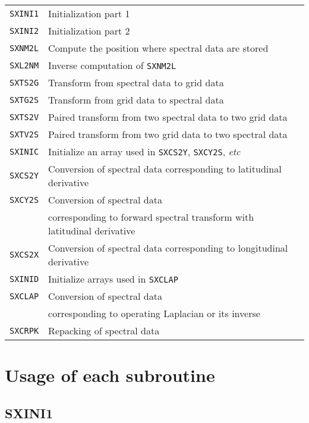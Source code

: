 \documentclass[a4paper]{scrartcl}
\begin{document}
\vspace{1em}
\begin{tabular}{ll}
\texttt{SXINI1} & Initialization part 1\\
\texttt{SXINI2} & Initialization part 2\\  
\texttt{SXNM2L} & Compute the position where spectral data are stored\\
\texttt{SXL2NM} & Inverse computation of \texttt{SXNM2L}\\
\texttt{SXTS2G} & Transform from spectral data to grid data\\
\texttt{SXTG2S} & Transform from grid data to spectral data\\
\texttt{SXTS2V} & Paired transform from two spectral data to two grid data\\
\texttt{SXTV2S} & Paired transform from two grid data to two spectral data\\
\texttt{SXINIC} & Initialize an array used in \texttt{SXCS2Y},
 \texttt{SXCY2S}, \textit{etc}\\
\texttt{SXCS2Y} & Conversion of spectral data 
corresponding to latitudinal derivative\\
\texttt{SXCY2S} & Conversion of spectral data \\
& corresponding to forward spectral transform with latitudinal derivative\\
\texttt{SXCS2X} & Conversion of spectral data 
corresponding to longitudinal derivative\\
\texttt{SXINID} & Initialize arrays used in \texttt{SXCLAP}\\
\texttt{SXCLAP} &  Conversion of spectral data \\
& corresponding to operating Laplacian or its inverse\\
\texttt{SXCRPK} & Repacking of spectral data 
\end{tabular}


\section{Usage of each subroutine}

\subsection{SXINI1}
\end{document}
